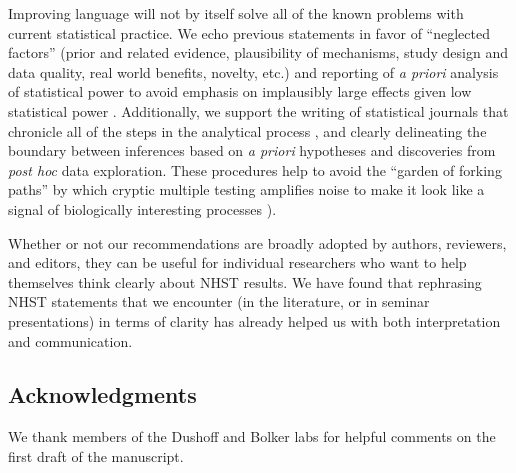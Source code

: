 Improving language will not by itself solve all of the known problems with current statistical practice. We echo previous statements in favor of ``neglected factors'' (prior and related evidence, plausibility of mechanisms, study design and data quality, real world benefits, novelty, etc.) \citep{McShaneetal.2017} and reporting of \emph{a priori} analysis of statistical power to avoid emphasis on implausibly large effects given low statistical power \citep[the ``winner's curse''][]{GelmanandCarlin2014, SzucsandIoannidis2017, Bernardietal.2017}. Additionally, we support the writing of statistical journals that chronicle all of the steps in the analytical process \citep{Kassetal.2016}, and clearly delineating the boundary between inferences based on \emph{a priori} hypotheses and discoveries from \emph{post hoc} data exploration. These procedures help to avoid the ``garden of forking paths'' by which cryptic multiple testing amplifies noise to make it look like a signal of biologically interesting processes \citep{gelman_statistical_2014}). 

Whether or not our recommendations are broadly adopted by authors, reviewers, and editors, they can be useful for individual researchers who want to help themselves think clearly about NHST results. We have found that rephrasing NHST statements that we encounter (in the literature, or in seminar presentations) in terms of clarity has already helped us with both interpretation and communication.

\subsection*{Acknowledgments}

\noindent We thank members of the Dushoff and Bolker labs for helpful comments on the first draft of the manuscript.

